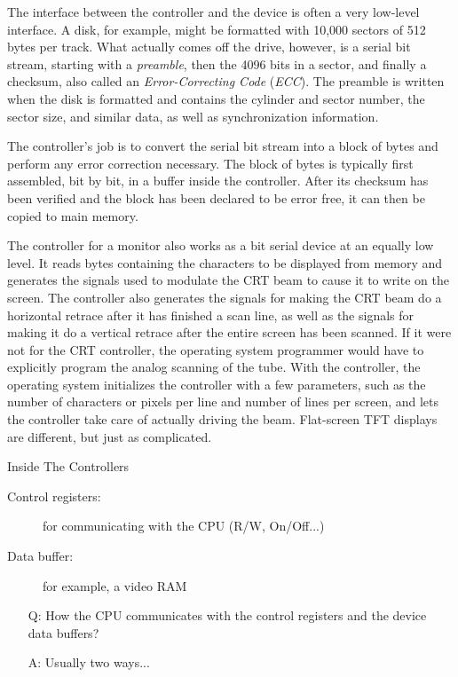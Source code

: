 The interface between the controller and the device is often a very low-level interface. A
disk, for example, might be formatted with 10,000 sectors of 512 bytes per track. What
actually comes off the drive, however, is a serial bit stream, starting with a
\emph{preamble}, then the 4096 bits in a sector, and finally a checksum, also called an
\emph{Error-Correcting Code} (\emph{ECC}). The preamble is written when the disk is
formatted and contains the cylinder and sector number, the sector size, and similar data,
as well as synchronization information.

The controller's job is to convert the serial bit stream into a block of bytes and perform
any error correction necessary. The block of bytes is typically first assembled, bit by
bit, in a buffer inside the controller. After its checksum has been verified and the block
has been declared to be error free, it can then be copied to main memory.

The controller for a monitor also works as a bit serial device at an equally low level. It
reads bytes containing the characters to be displayed from memory and generates the
signals used to modulate the CRT beam to cause it to write on the screen. The controller
also generates the signals for making the CRT beam do a horizontal retrace after it has
finished a scan line, as well as the signals for making it do a vertical retrace after the
entire screen has been scanned. If it were not for the CRT controller, the operating
system programmer would have to explicitly program the analog scanning of the tube. With
the controller, the operating system initializes the controller with a few parameters,
such as the number of characters or pixels per line and number of lines per screen, and
lets the controller take care of actually driving the beam. Flat-screen TFT displays are
different, but just as complicated.

\begin{frame}{Inside The Controllers}
  \begin{description}
  \item[Control registers:] for communicating with the CPU (R/W, On/Off...)
  \item[Data buffer:] for example, a video RAM
  \end{description}
  \begin{itemize}
  \item[Q:] How the CPU communicates with the control registers and the device data
    buffers?
  \item[A:] Usually two ways...
  \end{itemize}
\end{frame}

